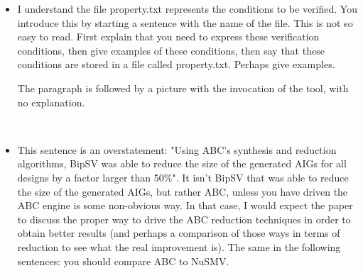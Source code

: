 \begin{itemize}
\begin{itemize}
~


\item I understand the file property.txt represents the conditions to be verified.
You introduce this by starting a sentence with the name of the file. This is
not so easy to read. First explain that you need to express these
verification conditions, then give examples of these conditions, then say
that these conditions are stored in a file called property.txt. Perhaps
give examples.

The paragraph is followed by a picture with the invocation of the tool, with
no explanation.

~


\item This sentence is an overstatement: "Using ABC’s synthesis and reduction
algorithms, BipSV was able to reduce the size of the generated AIGs for all
designs by a factor larger than 50\%". It isn't BipSV that was able to reduce
the size of the generated AIGs, but rather ABC, unless you have driven the
ABC engine is some non-obvious way. In that case, I would expect the paper
to discuss the proper way to drive the ABC reduction techniques in order to
obtain better results (and perhaps a comparison of those ways in terms of
reduction to see what the real improvement is). The same in the following
sentences: you should compare ABC to NuSMV.

~

\end{itemize}
\end{itemize}

















